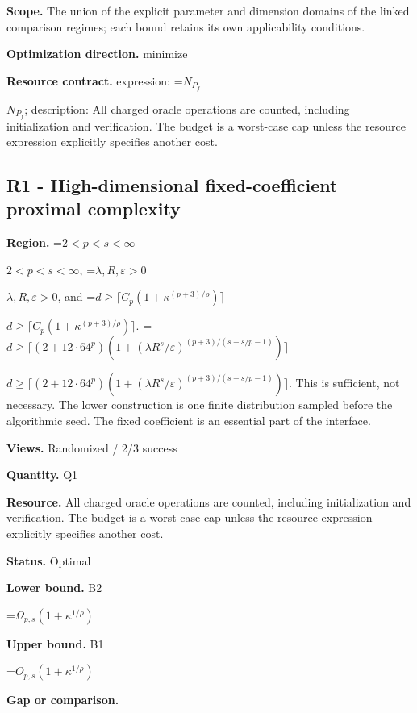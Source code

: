 \documentclass[10pt,a4paper]{article}
\newcommand{\AtlasMath}[1]{\par\begingroup\centering\setbox0=\hbox{$\displaystyle #1$}\ifdim\wd0>1.4\linewidth\typeout{ATLAS WIDE FORMULA: \the\wd0}\fi\ifdim\wd0>\linewidth\resizebox{\linewidth}{!}{\box0}\else\box0\fi\par\endgroup}
\newcommand{\AtlasInlineMath}[1]{\begingroup\setbox0=\hbox{$#1$}\ifdim\wd0>.4\linewidth\endgroup\AtlasMath{#1}\else\endgroup$#1$\fi}
\begin{document}
\textbf{Scope.} The union of the explicit parameter and dimension domains of the linked comparison regimes; each bound retains its own applicability conditions.



\textbf{Optimization direction.} minimize



\textbf{Resource contract.} expression: \AtlasInlineMath{N_{P_f}}; description: All charged oracle operations are counted, including initialization and verification. The budget is a worst-case cap unless the resource expression explicitly specifies another cost.



\subsection{R1 - High-dimensional fixed-coefficient proximal complexity}


\textbf{Region.} \AtlasInlineMath{2<p<s<\infty}, \AtlasInlineMath{\lambda,R,\varepsilon>0}, and \AtlasInlineMath{d\ge\lceil C_p(1+\kappa^{(p+3)/\rho})\rceil}. \AtlasInlineMath{d\ge\lceil(2+12\cdot64^p)(1+(\lambda R^s/\varepsilon)^{(p+3)/(s+s/p-1)})\rceil}. This is sufficient, not necessary. The lower construction is one finite distribution sampled before the algorithmic seed. The fixed coefficient is an essential part of the interface.



\textbf{Views.} Randomized / 2/3 success



\textbf{Quantity.} Q1



\textbf{Resource.} All charged oracle operations are counted, including initialization and verification. The budget is a worst-case cap unless the resource expression explicitly specifies another cost.



\textbf{Status.} Optimal



\textbf{Lower bound.} B2



\AtlasMath{\Omega_{p,s}(1+\kappa^{1/\rho})}


\textbf{Upper bound.} B1



\AtlasMath{O_{p,s}(1+\kappa^{1/\rho})}


\textbf{Gap or comparison.}
\end{document}
